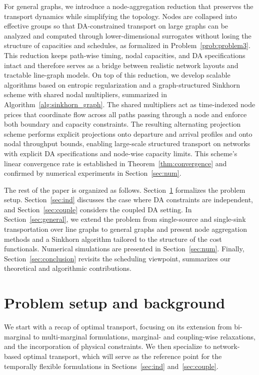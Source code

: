 \documentclass[11pt]{article}
\begin{document}
For general graphs, we introduce a node-aggregation reduction that preserves the transport dynamics while simplifying the topology. Nodes are collapsed into effective groups so that DA-constrained transport on large graphs can be analyzed and computed through lower-dimensional surrogates without losing the structure of capacities and schedules, as formalized in Problem~\ref{prob:problem3}. This reduction keeps path-wise timing, nodal capacities, and DA specifications intact and therefore serves as a bridge between realistic network layouts and tractable line-graph models. On top of this reduction, we develop scalable algorithms based on entropic regularization and a graph-structured Sinkhorn scheme with shared nodal multipliers, summarized in Algorithm~\ref{alg:sinkhorn_graph}. The shared multipliers act as time-indexed node prices that coordinate flow across all paths passing through a node and enforce both boundary and capacity constraints. The resulting alternating projection scheme performs explicit projections onto departure and arrival profiles and onto nodal throughput bounds, enabling large-scale structured transport on networks with explicit DA specifications and node-wise capacity limits. This scheme's linear convergence rate is established in Theorem~\ref{thm:convergence} and confirmed by numerical experiments in Section~\ref{sec:num}.


The rest of the paper is organized as follows. Section~\ref{sec:prelim} formalizes the problem setup. Section~\ref{sec:ind} discusses the case where DA constraints are independent, and Section~\ref{sec:couple} considers the coupled DA setting. In Section~\ref{sec:general}, we extend the problem from single-source and single-sink transportation over line graphs to general graphs and present node aggregation methods and a Sinkhorn algorithm tailored to the structure of the cost functionals. Numerical simulations are presented in Section~\ref{sec:num}. Finally, Section~\ref{sec:conclusion} revisits the scheduling viewpoint, summarizes our theoretical and algorithmic contributions.



\section{Problem setup and background}\label{sec:prelim}

We start with a recap of optimal transport, focusing on its extension from bi-marginal to multi-marginal formulations, marginal- and coupling-wise relaxations, and the incorporation of physical constraints. We then specialize to network-based optimal transport, which will serve as the reference point for the temporally flexible formulations in Sections~\ref{sec:ind} and~\ref{sec:couple}.
\end{document}
